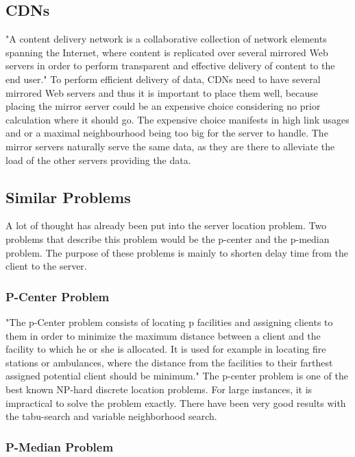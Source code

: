 \documentclass [12pt]{article}
\begin{document}
    \subsection {CDNs}
        "A content delivery network is a collaborative collection of network elements spanning
        the Internet, where content is replicated over several mirrored Web servers in order
        to perform transparent and effective delivery of content to the end user."\cite[p. 3]{Buyya:2008:CDN:1457653}
        To perform efficient delivery of data, CDNs need to have several mirrored Web servers
        and thus it is important to place them well, because placing the mirror server 
        could be an expensive choice considering no prior calculation where it should go. 
        The expensive choice manifests in high link usages and or a maximal neighbourhood being
        too big for the server to handle.
        The mirror servers naturally serve the same data, as they are there to alleviate the 
        load of the other servers providing the data.
        
    \subsection {Similar Problems}
    A lot of thought has already been put into the server location problem.
    Two problems that describe this problem would be the p-center and the
    p-median problem. The purpose of these problems is mainly to shorten delay
    time from the client to the server. 
    \subsubsection {P-Center Problem}
    "The p-Center problem consists of locating p facilities and assigning clients
    to them in order to minimize the maximum distance between a client and the facility
    to which he or she is allocated. It is used for example in locating fire stations or ambulances,
    where the distance from the facilities 
    to their farthest assigned potential client should be minimum."\cite{Mladenovic00solvingthe}
    The p-center problem is one of the best known NP-hard discrete location problems.\cite{KarivHakimi1979}
    For large instances, it is impractical to solve the problem exactly.
    There have been very good results with the tabu-search and variable neighborhood search.
    \cite{Mladenovic00solvingthe}
    \subsubsection {P-Median Problem}
    
\end{document}
